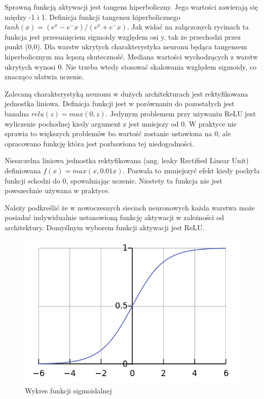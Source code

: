 \documentclass[12pt,a4paper,twoside,titlepage,openright]{book}
\begin{document}
Sprawną funkcją aktywacji jest tangens hiperboliczny. Jego wartości zawierają się między -1 i 1. Definicja funkcji tangensu hiperbolicznego $tanh(x) = (e^x - e^-x) / (e^x + e^-x)$. Jak widać na załączonych rycinach ta funkcja jest przesunięciem sigmoidy względem osi y, tak że przechodzi przez punkt (0,0). Dla warstw ukrytych charakterystyka neuronu będąca tangensem hiperbolicznym ma lepszą skuteczność. Mediana wartości wychodzących z warstw  ukrytych wynosi 0. Nie trzeba wtedy stosować skalowania względem sigmoidy, co znacząco ułatwia uczenie.

Zalecaną charakterystyką neuronu w dużych architekturach jest rektyfikowana jednostka liniowa. Definicja funkcji jest w porównaniu do pozostałych jest banalna $relu(z) = max(0,z)$. Jedynym problemem przy używaniu ReLU jest wyliczenie pochodnej kiedy argument z jest mniejszy od 0. W praktyce nie sprawia to większych problemów bo wartość zostanie ustawiona na 0, ale opracowano funkcję która jest pozbawiona tej niedogodności.

Nieszczelna liniowa jednostka rektyfikowana (ang. leaky Rectified Linear Unit) definiowana $f(x) = max(x, 0.01x)$. Pozwala to zmniejszyć efekt kiedy pochyła funkcji schodzi do 0, spowalniając uczenie. Niestety ta funkcja nie jest powszechnie używana w praktyce.

Należy podkreślić że w nowoczesnych sieciach neuronowych każda warstwa może posiadać indywidualnie ustanowioną funkcję aktywacji w zależności od architektury. Domyślnym wyborem funkcji aktywacji jest ReLU. 

\begin{figure}[h]
	\centering
			\includegraphics[resolution=100, scale=0.3]{Sigmoid.png}
		\caption{Wykres funkcji sigmoidalnej}
\end{figure}
\end{document}
